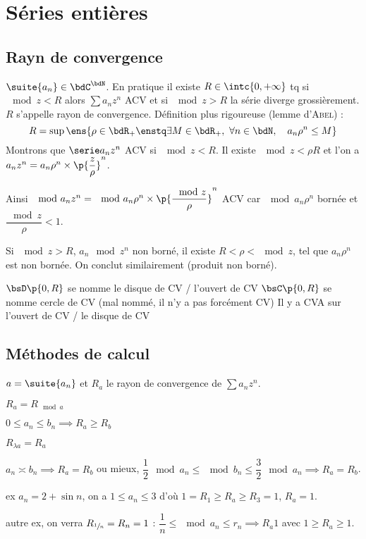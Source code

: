 \documentclass[a4paper,french,bookmarks]{book}
\begin{document}
    \chapter{Séries entières}
    
    \section{Rayn de convergence}
    
    $\suite{a_n} \in \bdC^\bdN$. En pratique il existe $R \in \intc{0, +\infty}$ tq si $\mod{z} < R$ alors $\sum a_nz^n$ ACV et si $\mod{z} > R$ la série diverge grossièrement. $R$ s'appelle rayon de convergence. Définition plus rigoureuse (lemme d'\textsc{Abel}) :
    \[ R = \sup \ens{\rho \in \bdR_+ \enstq \exists M \in \bdR_+,\ \forall n \in \bdN,\quad a_n\rho^n \leq M}\]
    Montrons que $\serie a_nz^n$ ACV si $\mod{z} < R$. Il existe $\mod{z} < \rho  R$ et l'on a $a_nz^n = a_n\rho^n \times \p{\dfrac{z}{\rho}}^n$.
    
    Ainsi $\mod{a_nz^n} = \mod{a_n\rho^n}\times\p{\dfrac{\mod{z}}{\rho}}^n$ ACV car $\mod{a_n\rho^n}$ bornée et $\dfrac{\mod{z}}{\rho} < 1$.
    
    Si $\mod{z} > R$, $a_n\mod{z}^n$ non borné, il existe $R < \rho < \mod{z}$, tel que $a_n\rho^n$ est non bornée. On conclut similairement (produit non borné).
    
    \begin{enumerate}
        \itt $\bsD\p{0, R}$ se nomme le disque de CV / l'ouvert de CV
        \itt $\bsC\p{0, R}$ se nomme cercle de CV (mal nommé, il n'y a pas forcément CV)
        \itt Il y a CVA sur l'ouvert de CV / le disque de CV
    \end{enumerate}
    
    \section{Méthodes de calcul}
    
    $a = \suite{a_n}$ et $R_a$ le rayon de convergence de $\sum a_nz^n$.
    
    \begin{enumerate}
        \itstar $R_a = R_{\mod{a}}$
        
        \itstar $0 \leq a_n \leq b_n \implies R_a \geq R_b$
        
        \itstar $R_{\lambda a} = R_a$
        
        \itstar $a_n \asymp b_n \implies R_a = R_b$ ou mieux, $\dfrac{1}{2}\mod{a_n} \leq \mod{b_n} \leq \dfrac{3}{2}\mod{a_n} \implies R_a = R_b$.
        
        ex $a_n = 2 + \sin n$, on a $1 \leq a_n \leq 3$ d'où $1 = R_1 \geq R_a \geq R_3 = 1$, \ie $R_a = 1$.
        
        autre ex, on verra $R_{\sfrac{1}{n}} = R_n = 1$ : $\dfrac{1}{n} \leq \mod{a_n} \leq r_n \implies R_a 1$ avec $1 \geq R_a \geq 1$.
    \end{enumerate}
    
\end{document}
